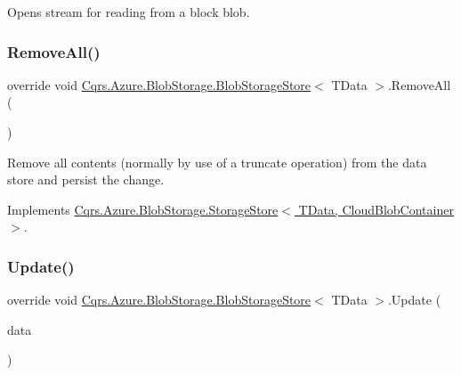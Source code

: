 Opens stream for reading from a block blob. 

\mbox{\label{classCqrs_1_1Azure_1_1BlobStorage_1_1BlobStorageStore_a4371b95250e51b8462d8ab33b6f3fe9e_a4371b95250e51b8462d8ab33b6f3fe9e}} 
\subsubsection{\texorpdfstring{Remove\+All()}{RemoveAll()}}
{\footnotesize\ttfamily override void \hyperlink{classCqrs_1_1Azure_1_1BlobStorage_1_1BlobStorageStore}{Cqrs.\+Azure.\+Blob\+Storage.\+Blob\+Storage\+Store}$<$ T\+Data $>$.Remove\+All (\begin{DoxyParamCaption}{ }\end{DoxyParamCaption})\hspace{0.3cm}{\ttfamily [virtual]}}



Remove all contents (normally by use of a truncate operation) from the data store and persist the change. 



Implements \hyperlink{classCqrs_1_1Azure_1_1BlobStorage_1_1StorageStore_a4e848f342be903293812b3b660464d1a_a4e848f342be903293812b3b660464d1a}{Cqrs.\+Azure.\+Blob\+Storage.\+Storage\+Store$<$ T\+Data, Cloud\+Blob\+Container $>$}.

\mbox{\label{classCqrs_1_1Azure_1_1BlobStorage_1_1BlobStorageStore_a03be976aded454866b4589de99a9e1c8_a03be976aded454866b4589de99a9e1c8}} 
\subsubsection{\texorpdfstring{Update()}{Update()}}
{\footnotesize\ttfamily override void \hyperlink{classCqrs_1_1Azure_1_1BlobStorage_1_1BlobStorageStore}{Cqrs.\+Azure.\+Blob\+Storage.\+Blob\+Storage\+Store}$<$ T\+Data $>$.Update (\begin{DoxyParamCaption}\item[{T\+Data}]{data }\end{DoxyParamCaption})\hspace{0.3cm}{\ttfamily [virtual]}}



